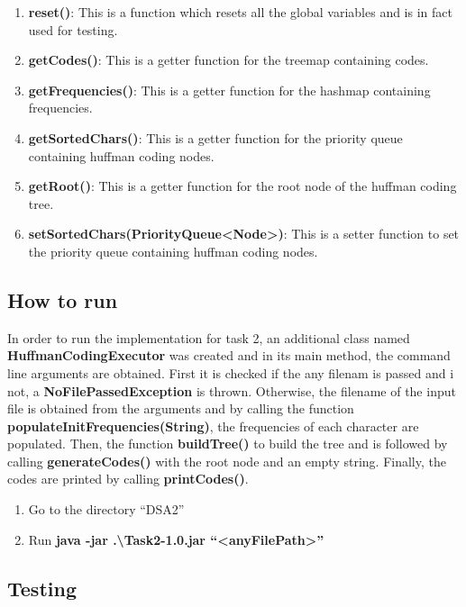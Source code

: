 \documentclass{article}
\newcommand{\quotes}[1]{``#1''}
\begin{document}
\begin{enumerate}
				\item \textbf{reset()}: This is a function which resets all the global variables and is in fact used for testing.
				
				\item \textbf{getCodes()}: This is a getter function for the treemap containing codes.
				\item \textbf{getFrequencies()}: This is a getter function for the hashmap containing frequencies.
				\item \textbf{getSortedChars()}: This is a getter function for the priority queue containing huffman coding nodes.
				\item \textbf{getRoot()}: This is a getter function for the root node of the huffman coding tree.
				\item \textbf{setSortedChars(PriorityQueue\textless Node\textgreater)}: This is a setter function to set the priority queue containing huffman coding nodes.
				
				

		\end{enumerate}
		
		\subsection{How to run}

In order to run the implementation for task 2, an additional class named \textbf{HuffmanCodingExecutor} was created and in its main method, the command line arguments are obtained. First it is checked if the any filenam is passed and i not, a \textbf{NoFilePassedException} is thrown. Otherwise, the filename of the input file is obtained from the arguments and by calling the function \textbf{populateInitFrequencies(String)}, the frequencies of each character are populated. Then, the function \textbf{buildTree()} to build the tree and is followed by calling \textbf{generateCodes()} with the root node and an empty string. Finally, the codes are printed by calling \textbf{printCodes()}.

\begin{enumerate}
\item Go to the directory \quotes{DSA2}
\item Run \textbf{java -jar .\textbackslash Task2-1.0.jar \quotes{\textless anyFilePath\textgreater}}
\end{enumerate}

		\subsection{Testing}
\end{document}
